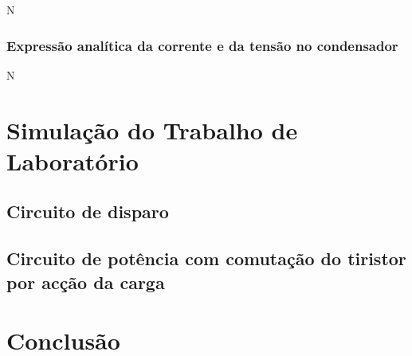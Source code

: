 \documentclass[a4paper,11pt]{article}
\numberwithin{equation}{section}
\begin{document}
N

\subsubsection{Expressão analítica da corrente e da tensão no condensador}

N

\pagebreak

\section{Simulação do Trabalho de Laboratório}

\subsection{Circuito de disparo}

\subsection{Circuito de potência com comutação do tiristor por acção da carga}

\pagebreak

\section{Conclusão}
\end{document}
